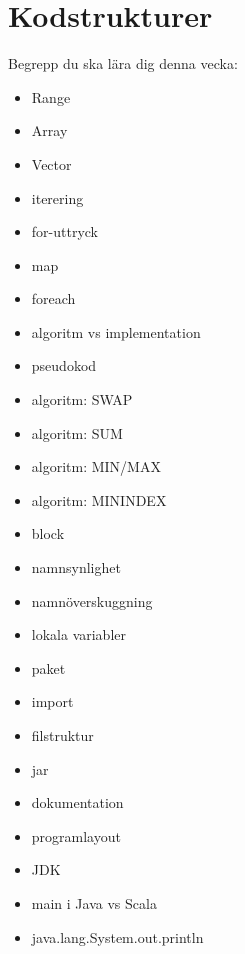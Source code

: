 \chapter{Kodstrukturer}\label{chapter:W02}
Begrepp du ska lära dig denna vecka:
\begin{itemize}[noitemsep,label={$\square$},leftmargin=*]
\item Range
\item Array
\item Vector
\item iterering
\item for-uttryck
\item map
\item foreach
\item algoritm vs implementation
\item pseudokod
\item algoritm: SWAP
\item algoritm: SUM
\item algoritm: MIN/MAX
\item algoritm: MININDEX
\item block
\item namnsynlighet
\item namnöverskuggning
\item lokala variabler
\item paket
\item import
\item filstruktur
\item jar
\item dokumentation
\item programlayout
\item JDK
\item main i Java vs Scala
\item java.lang.System.out.println\end{itemize}

